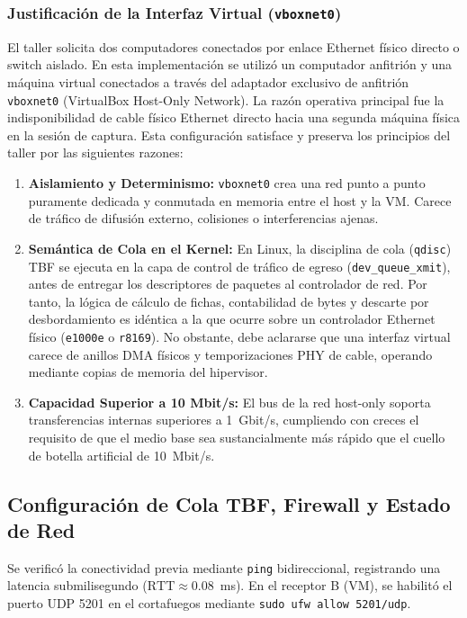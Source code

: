 \documentclass[11pt,a4paper]{article}
\begin{document}
\subsubsection{Justificación de la Interfaz Virtual (\texttt{vboxnet0})}
El taller solicita dos computadores conectados por enlace Ethernet físico directo o switch aislado. En esta implementación se utilizó un computador anfitrión y una máquina virtual conectados a través del adaptador exclusivo de anfitrión \texttt{vboxnet0} (VirtualBox Host-Only Network). La razón operativa principal fue la indisponibilidad de cable físico Ethernet directo hacia una segunda máquina física en la sesión de captura. Esta configuración satisface y preserva los principios del taller por las siguientes razones:
\begin{enumerate}
    \item \textbf{Aislamiento y Determinismo:} \texttt{vboxnet0} crea una red punto a punto puramente dedicada y conmutada en memoria entre el host y la VM. Carece de tráfico de difusión externo, colisiones o interferencias ajenas.
    \item \textbf{Semántica de Cola en el Kernel:} En Linux, la disciplina de cola (\texttt{qdisc}) TBF se ejecuta en la capa de control de tráfico de egreso (\texttt{dev\_queue\_xmit}), antes de entregar los descriptores de paquetes al controlador de red. Por tanto, la lógica de cálculo de fichas, contabilidad de bytes y descarte por desbordamiento es idéntica a la que ocurre sobre un controlador Ethernet físico (\texttt{e1000e} o \texttt{r8169}). No obstante, debe aclararse que una interfaz virtual carece de anillos DMA físicos y temporizaciones PHY de cable, operando mediante copias de memoria del hipervisor.
    \item \textbf{Capacidad Superior a 10 Mbit/s:} El bus de la red host-only soporta transferencias internas superiores a 1~Gbit/s, cumpliendo con creces el requisito de que el medio base sea sustancialmente más rápido que el cuello de botella artificial de 10~Mbit/s.
\end{enumerate}

\subsection{Configuración de Cola TBF, Firewall y Estado de Red}
Se verificó la conectividad previa mediante \texttt{ping} bidireccional, registrando una latencia submilisegundo ($\text{RTT} \approx 0.08$~ms). En el receptor B (VM), se habilitó el puerto UDP 5201 en el cortafuegos mediante \texttt{sudo ufw allow 5201/udp}.
\end{document}
